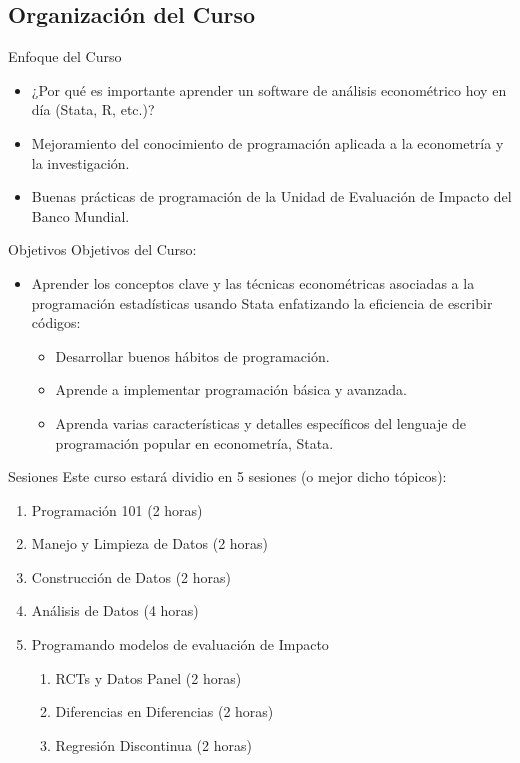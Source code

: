 \documentclass[11pt, aspectratio=169, compress]{beamer}
\begin{document}
\subsection{Organización del Curso}
\begin{frame}{Enfoque del Curso}
	\begin{itemize}
		\item ¿Por qué es importante aprender un software de análisis econométrico hoy en día (Stata, R, etc.)? 
		\item Mejoramiento del conocimiento de programación aplicada a la econometría y la investigación.
		\item Buenas prácticas de programación de la Unidad de Evaluación de Impacto del Banco Mundial.
	\end{itemize}
\end{frame}
\begin{frame}{Objetivos}
	Objetivos del Curso: 
	\begin{itemize}
		\item Aprender los conceptos clave y las técnicas econométricas asociadas a la programación estadísticas usando Stata enfatizando la eficiencia de escribir códigos: 
		\begin{itemize}
			\item Desarrollar buenos hábitos de programación.
			\item Aprende a implementar programación básica y avanzada.
			\item Aprenda varias características y detalles específicos del lenguaje de programación popular en econometría, Stata.
		\end{itemize}

	\end{itemize}
\end{frame}
\begin{frame}{Sesiones}
	Este curso estará dividio en 5 sesiones (o mejor dicho tópicos):
	\begin{enumerate}
		\item Programación 101 (2 horas)
		\item Manejo y Limpieza de Datos (2 horas)
		\item Construcción de Datos (2 horas)
		\item Análisis de Datos (4 horas)
		\item Programando modelos de evaluación de Impacto
		\begin{enumerate}
			\item RCTs y Datos Panel (2 horas)
			\item Diferencias en Diferencias (2 horas)
			\item Regresión Discontinua (2 horas)
		\end{enumerate}
	\end{enumerate}	
\end{frame}
\end{document}
